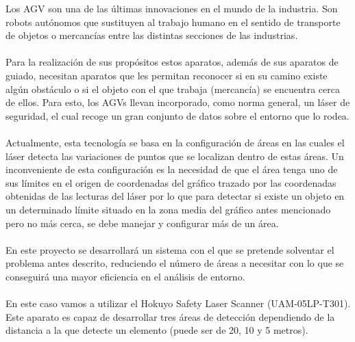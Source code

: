 
Los AGV son una de las últimas innovaciones en el mundo de la industria. Son robots autónomos que sustituyen al trabajo humano en el sentido de transporte de objetos o mercancías entre las distintas secciones de las industrias. \\
\\
Para la realización de sus propósitos estos aparatos, además de sus aparatos de guiado, necesitan aparatos que les permitan reconocer si en su camino existe algún obstáculo o si el objeto con el que trabaja (mercancía) se encuentra cerca de ellos. Para esto, los AGVs llevan incorporado, como norma general, un láser de seguridad, el cual recoge un gran conjunto de datos sobre el entorno que lo rodea.\\
\\
Actualmente, esta tecnología se basa en la configuración de áreas en las cuales el láser detecta las variaciones de puntos que se localizan dentro de estas áreas. Un inconveniente de esta configuración es la necesidad de que el área tenga uno de sus límites en el origen de coordenadas del gráfico trazado por las coordenadas obtenidas de las lecturas del láser por lo que para detectar si existe un objeto en un determinado límite situado en la zona media del gráfico antes mencionado pero no más cerca, se debe manejar y configurar más de un área.\\
\\
En este proyecto se desarrollará un sistema con el que se pretende solventar el problema antes descrito, reduciendo el número de áreas a necesitar con lo que se conseguirá una mayor eficiencia en el análisis de entorno.\\
\\
En este caso vamos a utilizar el Hokuyo Safety Laser Scanner (UAM-05LP-T301). Este aparato es capaz de desarrollar tres áreas de detección dependiendo de la distancia a la que detecte un elemento (puede ser de 20, 10 y 5 metros).\\